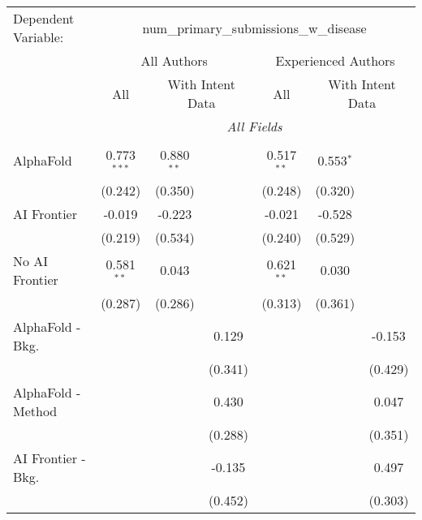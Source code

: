 \begingroup
\centering
\begin{tabular}{lcccccc}
   \tabularnewline \midrule \midrule
   Dependent Variable: & \multicolumn{6}{c}{num\_primary\_submissions\_w\_disease}\\
 & \multicolumn{3}{c}{All Authors} & \multicolumn{3}{c}{Experienced Authors} \\
\cmidrule(lr){2-4} \cmidrule(lr){5-7}
 & \multicolumn{1}{c}{All} & \multicolumn{2}{c}{With Intent Data} & \multicolumn{1}{c}{All} & \multicolumn{2}{c}{With Intent Data} \\
\cmidrule(lr){2-2} \cmidrule(lr){3-4} \cmidrule(lr){5-5} \cmidrule(lr){6-7}
 & \multicolumn{6}{c}{\textit{All Fields}} \\ \\
   AlphaFold               & 0.773$^{***}$ & 0.880$^{**}$ &             & 0.517$^{**}$ & 0.553$^{*}$ &   \\   
                           & (0.242)       & (0.350)      &             & (0.248)      & (0.320)     &   \\   
   AI Frontier             & -0.019        & -0.223       &             & -0.021       & -0.528      &   \\   
                           & (0.219)       & (0.534)      &             & (0.240)      & (0.529)     &   \\   
   No AI Frontier          & 0.581$^{**}$  & 0.043        &             & 0.621$^{**}$ & 0.030       &   \\   
                           & (0.287)       & (0.286)      &             & (0.313)      & (0.361)     &   \\   
   AlphaFold - Bkg.        &               &              & 0.129       &              &             & -0.153\\   
                           &               &              & (0.341)     &              &             & (0.429)\\   
   AlphaFold - Method      &               &              & 0.430       &              &             & 0.047\\   
                           &               &              & (0.288)     &              &             & (0.351)\\   
   AI Frontier - Bkg.      &               &              & -0.135      &              &             & 0.497\\   
                           &               &              & (0.452)     &              &             & (0.303)\\   

\end{tabular}
